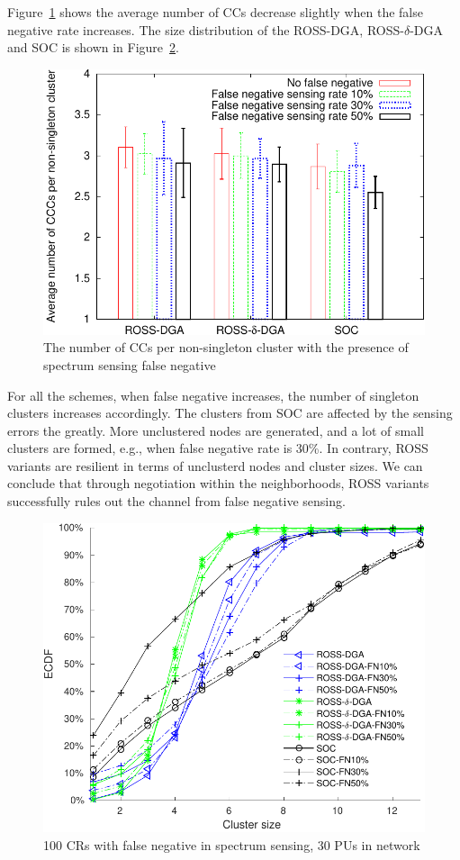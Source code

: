 \documentclass[times]{ettauth}
\newcommand{\eg}{e.g., }
\theoremstyle{mytheoremstyle}
\theoremstyle{mytheoremstyle}
\theoremstyle{mytheoremstyle}
\begin{document}
Figure~\ref{false_negative_ccc} shows the average number of CCs decrease slightly when the false negative rate increases.
The size distribution of the ROSS-DGA, ROSS-$\delta$-DGA and SOC is shown in Figure~\ref{false_negative_CDF}.
\begin{figure}[!h]
  \centering
   \includegraphics[width=0.7\linewidth]{false_negative.pdf}
  \caption{The number of CCs per non-singleton cluster with the presence of spectrum sensing false negative}
  \label{false_negative_ccc}
\end{figure}
For all the schemes, when false negative increases, the number of singleton clusters increases accordingly.
The clusters from SOC are affected by the sensing errors the greatly.
More unclustered nodes are generated, and a lot of small clusters are formed, \eg when false negative rate is 30\%.
In contrary, ROSS variants are resilient in terms of unclusterd nodes and cluster sizes.
We can conclude that through negotiation within the neighborhoods, ROSS variants successfully rules out the channel from false negative sensing.
\begin{figure}[!h]
  \centering
   \includegraphics[width=0.7\linewidth]{draw_cdf_clusterSize_with_false_negative.pdf}
  \caption{100 CRs with false negative in spectrum sensing, 30 PUs in network}
  \label{false_negative_CDF}
\end{figure}
\end{document}

